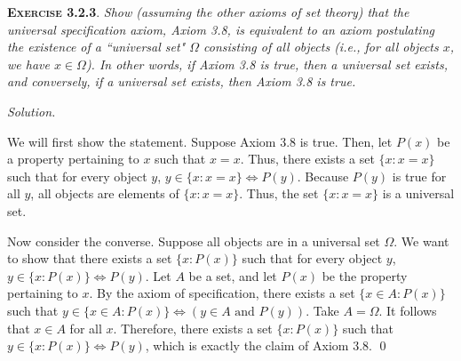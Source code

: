 \documentclass[12pt]{article}
\theoremstyle{remark}
\newenvironment{exer}[2]{
    \noindent \setlength{\parskip}{1em}%
    \textsc{\textbf{Exercise #1}}. \textit{#2} \par
    \noindent \textit{Solution.} %
}{\bigskip}
\begin{document}
\begin{exer}{3.2.3}{
    Show (assuming the other axioms of set theory) that the universal specification axiom, Axiom 3.8, is equivalent to an axiom postulating the existence of a ``universal set" $\Omega$ consisting of all objects (i.e., for all objects $x$, we have $x \in \Omega$).
    In other words, if Axiom 3.8 is true, then a universal set exists, and conversely, if a universal set exists, then Axiom 3.8 is true.
}
    We will first show the statement.
    Suppose Axiom 3.8 is true.
    Then, let $P(x)$ be a property pertaining to $x$ such that $x = x$.
    Thus, there exists a set $\{ x : x = x \}$ such that for every object $y$, $y \in \{ x : x = x\} \iff P(y)$.
    Because $P(y)$ is true for all $y$, all objects are elements of $\{ x : x = x \}$.
    Thus, the set $\{ x : x = x \}$ is a universal set.
    
    Now consider the converse.
    Suppose all objects are in a universal set $\Omega$.
    We want to show that there exists a set $\{ x : P(x) \}$ such that for every object $y$, $y \in \{x : P(x) \} \iff P(y)$.
    Let $A$ be a set, and let $P(x)$ be the property pertaining to $x$.
    By the axiom of specification, there exists a set $\{ x \in A : P(x) \}$ such that $y \in \{x \in A : P(x) \} \iff (y \in A \text{ and } P(y))$.
    Take $A = \Omega$.
    It follows that $x \in A$ for all $x$.
    Therefore, there exists a set $\{ x : P(x) \}$ such that $y \in \{x : P(x) \} \iff P(y)$, which is exactly the claim of Axiom 3.8. \qed
\end{exer}
\end{document}

